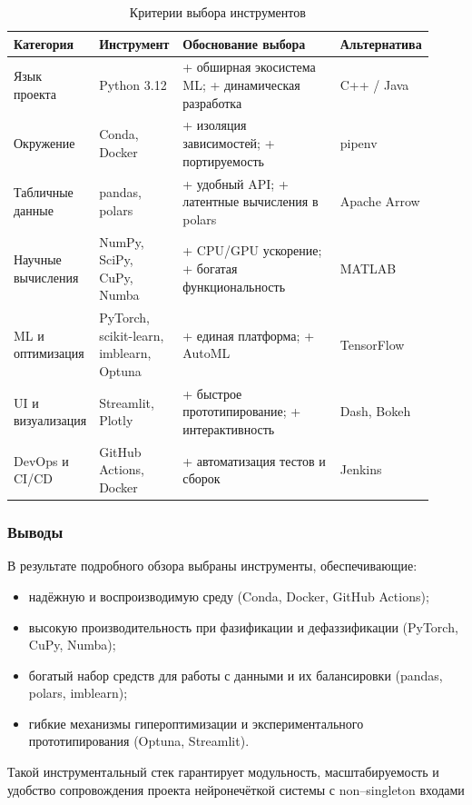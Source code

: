 \begin{table}[h]
\centering\small
\caption{Критерии выбора инструментов}
\label{tab:tool_choice}
\begin{tabular}{@{}p{0.16\linewidth}p{0.20\linewidth}p{0.44\linewidth}p{0.12\linewidth}@{}}
\toprule
\textbf{Категория} & \textbf{Инструмент} & \textbf{Обоснование выбора} & \textbf{Альтернатива} \\ \midrule
Язык проекта       & Python 3.12 & + обширная экосистема ML; + динамическая разработка  & C++ / Java \\[2pt]
Окружение          & Conda, Docker & + изоляция зависимостей; + портируемость & pipenv \\[2pt]
Табличные данные   & pandas, polars & + удобный API; + латентные вычисления в polars & Apache Arrow \\[2pt]
Научные вычисления & NumPy, SciPy, CuPy, Numba & + CPU/GPU ускорение; + богатая функциональность & MATLAB \\[2pt]
ML и оптимизация   & PyTorch, scikit-learn, imblearn, Optuna & + единая платформа; + AutoML & TensorFlow \\[2pt]
UI и визуализация  & Streamlit, Plotly & + быстрое прототипирование; + интерактивность & Dash, Bokeh \\[2pt]
DevOps и CI/CD     & GitHub Actions, Docker & + автоматизация тестов и сборок & Jenkins \\ 
\bottomrule
\end{tabular}
\end{table}

\subsubsection{Выводы}
\label{subsubsec:tool_summary}

В результате подробного обзора выбраны инструменты,
обеспечивающие:
\begin{itemize}
  \item надёжную и воспроизводимую среду (Conda, Docker, GitHub Actions);
  \item высокую производительность при фазификации и дефаззификации
        (PyTorch, CuPy, Numba);
  \item богатый набор средств для работы с данными и их балансировки
        (pandas, polars, imblearn);
  \item гибкие механизмы гипероптимизации и экспериментального
        прототипирования (Optuna, Streamlit).
\end{itemize}

Такой инструментальный стек гарантирует модульность, масштабируемость
и удобство сопровождения проекта нейронечёткой системы
с non–singleton входами
